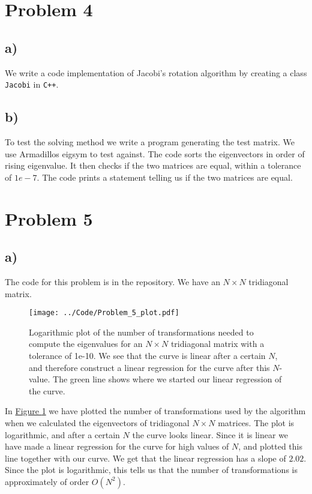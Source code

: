 \documentclass[english,notitlepage]{article}  %
\begin{document}
\section*{Problem 4}
\subsection*{a)}
We write a code implementation of Jacobi's rotation algorithm by creating a class \lstinline{Jacobi} in \lstinline{C++}.

\subsection*{b)}
To test the solving method we write a program generating the test matrix. We use
Armadillos eigsym to test against. The code sorts the eigenvectors in order of
rising eigenvalue. It then checks if the two matrices are equal, within a tolerance
of $1e-7$. The code prints a statement telling us if the two matrices are equal.

\section*{Problem 5}
\subsection*{a)}
The code for this problem is in the repository.
We have an $N \times N$ tridiagonal matrix.

\begin{figure}[H]
    \centering
    \texttt{[image: ../Code/Problem\_5\_plot.pdf]}
    \caption{Logarithmic plot of the number of transformations needed to compute the eigenvalues for an $N \times N$ tridiagonal matrix with a tolerance of 1e-10. We see that the curve is linear after a certain $N$, and therefore construct a linear regression for the curve after this $N$-value. The green line shows where we started our linear regression of the curve.}
    \label{fig:5plot}
\end{figure}

In \hyperref[fig:5plot]{Figure \ref*{fig:5plot}} we have plotted the number of
transformations used by the algorithm when we calculated the eigenvectors of
tridiagonal $N \times N$ matrices. The plot is logarithmic, and after a certain
$N$ the curve looks linear. Since it is linear we have made a linear regression
for the curve for high values of $N$, and plotted this line together with our
curve. We get that the linear regression has a slope of $2.02$. Since the plot
is logarithmic, this tells us that the number of transformations is
approximately of order $O(N^2)$.
\end{document}
